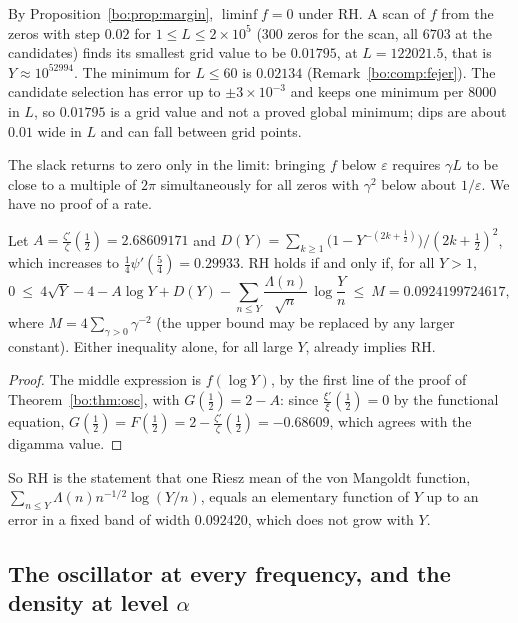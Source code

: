 \begin{remark}\label{bo:comp:records}
By Proposition~\ref{bo:prop:margin}, $\liminf f=0$ under RH. A scan of $f$ from the zeros with step $0.02$ for $1\le L\le2\times10^5$ (300 zeros for the scan, all $6703$ at the candidates) finds its smallest grid value to be $0.01795$, at $L=122021.5$, that is $Y\approx10^{52994}$. The minimum for $L\le60$ is $0.02134$ (Remark~\ref{bo:comp:fejer}). The candidate selection has error up to $\pm3\times10^{-3}$ and keeps one minimum per $8000$ in $L$, so $0.01795$ is a grid value and not a proved global minimum; dips are about $0.01$ wide in $L$ and can fall between grid points.
\end{remark}

The slack returns to zero only in the limit: bringing $f$ below $\varepsilon$ requires $\gamma L$ to be close to a multiple of $2\pi$ simultaneously for all zeros with $\gamma^2$ below about $1/\varepsilon$. We have no proof of a rate.

\begin{corollary}\label{bo:cor:elementary}
Let $A=\frac{\zeta'}{\zeta}(\frac12)=2.68609171$ and $D(Y)=\sum_{k\ge1}\bigl(1-Y^{-(2k+\frac12)}\bigr)/(2k+\frac12)^2$, which increases to $\frac14\psi'(\frac54)=0.29933$. RH holds if and only if, for all $Y>1$,
\[
0\ \le\ 4\sqrt Y-4-A\log Y+D(Y)-\sum_{n\le Y}\frac{\Lambda(n)}{\sqrt n}\,\log\frac Yn\ \le\ M=0.0924199724617,
\]
where $M=4\sum_{\gamma>0}\gamma^{-2}$ (the upper bound may be replaced by any larger constant). Either inequality alone, for all large $Y$, already implies RH.
\end{corollary}

\begin{proof}
The middle expression is $f(\log Y)$, by the first line of the proof of Theorem~\ref{bo:thm:osc}, with $G(\frac12)=2-A$: since $\frac{\xi'}{\xi}(\frac12)=0$ by the functional equation, $G(\frac12)=F(\frac12)=2-\frac{\zeta'}{\zeta}(\frac12)=-0.68609$, which agrees with the digamma value.
\end{proof}

So RH is the statement that one Riesz mean of the von Mangoldt function, $\sum_{n\le Y}\Lambda(n)n^{-1/2}\log(Y/n)$, equals an elementary function of $Y$ up to an error in a fixed band of width $0.092420$, which does not grow with $Y$.

\subsection{The oscillator at every frequency, and the density at level $\alpha$}\label{bo:sec:freq}

